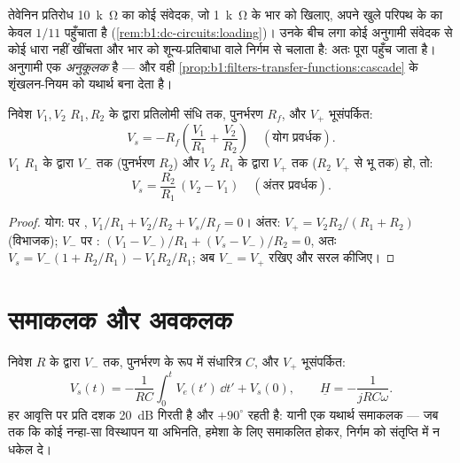 \begin{example}[अनुगामी क्यों]\label{ex:b1:operational-amplifier:follower}
तेवेनिन प्रतिरोध \qty{10}{k\ohm} का कोई संवेदक, जो \qty{1}{k\ohm} के
भार को खिलाए, अपने खुले परिपथ के  का केवल $1/11$ पहुँचाता है
(\cref{rem:b1:dc-circuits:loading})। उनके बीच लगा कोई अनुगामी संवेदक से कोई
धारा नहीं खींचता और भार को शून्य-प्रतिबाधा वाले निर्गम से चलाता है:
अतः पूरा  पहुँच जाता है। अनुगामी एक \emph{
अनुकूलक} है --- और वही \cref{prop:b1:filters-transfer-functions:cascade} के
शृंखलन-नियम को यथार्थ बना देता है।
\end{example}

\begin{proposition}[योग और अंतर प्रवर्धक]\label{prop:b1:operational-amplifier:sumdiff}
निवेश $V_1, V_2$ $R_1, R_2$ के द्वारा प्रतिलोमी संधि तक, पुनर्भरण
$R_f$, और $V_+$ भूसंपर्कित:
\[
V_s = -R_f\left(\frac{V_1}{R_1} + \frac{V_2}{R_2}\right)
\quad (\text{योग प्रवर्धक}).
\]
$V_1$ $R_1$ के द्वारा $V_-$ तक (पुनर्भरण $R_2$) और $V_2$
$R_1$ के द्वारा $V_+$ तक ($R_2$ $V_+$ से भू तक) हो, तो:
\[
V_s = \frac{R_2}{R_1}\,(V_2 - V_1)
\quad (\text{अंतर प्रवर्धक}).
\]
\end{proposition}

\begin{proof}
योग:  पर , $V_1/R_1 + V_2/R_2 + V_s/R_f =
0$। अंतर: $V_+ = V_2R_2/(R_1 + R_2)$ (विभाजक); $V_-$ पर :
$(V_1 - V_-)/R_1 + (V_s - V_-)/R_2 = 0$, अतः $V_s = V_-(1 + R_2/R_1) -
V_1R_2/R_1$; अब $V_- = V_+$ रखिए और सरल कीजिए।
\end{proof}

\section{समाकलक और अवकलक}

\begin{proposition}[समाकलक]\label{prop:b1:operational-amplifier:integrator}
निवेश $R$ के द्वारा $V_-$ तक, पुनर्भरण के रूप में संधारित्र $C$, और $V_+$
भूसंपर्कित:
\[
V_s(t) = -\frac{1}{RC}\int_0^t V_e(t')\,\dd t' + V_s(0),
\qquad
\underline H = -\frac{1}{jRC\omega} .
\]
 हर आवृत्ति पर प्रति दशक \qty{20}{dB} गिरती है और 
$+90^\circ$ रहती है: यानी एक यथार्थ समाकलक --- जब तक कि कोई नन्हा-सा विस्थापन
या अभिनति, हमेशा के लिए समाकलित होकर, निर्गम को संतृप्ति में न धकेल दे।
\end{proposition}

